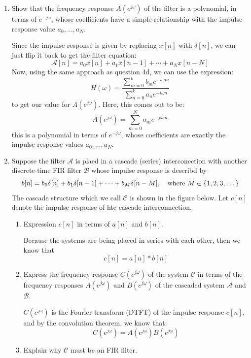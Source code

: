 \documentclass[10pt]{article}
\begin{document}
	\begin{enumerate}[label=\alph*)]
		\item Show that the frequency response \( A(e^{j \omega}) \) of the filter is a polynomial, in terms of 
			\( e^{- j \omega} \), whose coefficients have a simple relationship with the impulse response 
			value \( a_0, \dots, a_N \). 

			\begin{solution}
				Since the impulse response is given by replacing \( x[n]  \) with \( \delta[n] \), we can just flip 
				it back to get the filter equation:
				\[
					\mathcal A [n] = a_0 x[n] + a_1 x[n - 1] + \cdots + a_N x[n - N]
				\] 
				Now, using the same approach as question 4d, we can use the expression:
				\[
					H(\omega) = \frac{\sum_{m=0}^{k} b_m e^{-i \omega m}}{\sum_{n=0}^{k} a_n e^{-i \omega n}}
				\] 
				to get our value for \( A(e^{j \omega}) \). Here, this comes out to be:
				\[
				A(e^{j \omega}) = \sum_{m=0}^{N} a_m e^{- j \omega m}
				\] 
				this is a polynomial in terms of \( e^{- j \omega} \), whose coefficients are exactly 
				the impulse response values \( a_0, \dots, a_N \). 
			\end{solution}
		\item Suppose the filter \( \mathcal A \) is plaed in a cascade (series) interconection with another 
			discrete-time FIR filter \( \mathcal B \) whose impulse response is describd by 
			\[
				b[n]= b_0\delta[n] + b_1\delta[n-1] + \cdots + b_M \delta[n - M], \quad \text{where \( M \in 
				\{ 1, 2, 3, \dots\} \)}
			\] 
			The cascade structure which we call \( \mathcal C \) is shown in the figure below.
			Let  \( c[n] \) denote the impulse response of hte cascade interconnection.
			\begin{enumerate}[label=\alph*)]
				\item Expression \( c[n] \) in terms of \( a[n] \) and \( b[n] \). 

					\begin{solution}
						Because the systems are being placed in series with each other, then we know that 
						\[
							c[n] = a[n] * b[n]
						\] 
					\end{solution}
				\item Express the frequency response \( C(e^{j \omega}) \) of the system \( \mathcal C \) in terms 
					of the frequency responses \( A(e^{j \omega}) \) and \( B(e^{j \omega}) \) of the 
					cascaded system \( \mathcal A \) and \( \mathcal B \).

					\begin{solution}
						\( C(e^{j \omega})  \) is the Fourier transform (DTFT) of the impulse response \( c[n] \), 
						and by the convolution theorem, we know that:
						\[
						C(e^{j \omega}) = A(e^{j \omega}) B(e^{j \omega})
						\] 
					\end{solution}
				\item Explain why \( \mathcal C \) must be an FIR filter. 


\end{enumerate}
\end{enumerate}
\end{document}
